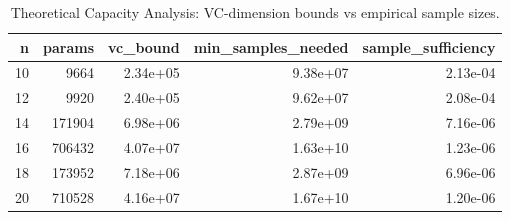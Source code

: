 \begin{table}
\caption{Theoretical Capacity Analysis: VC-dimension bounds vs empirical sample sizes.}
\label{tab:theory_capacity}
\begin{tabular}{rrrrr}
\toprule
n & params & vc_bound & min_samples_needed & sample_sufficiency \\
\midrule
10 & 9664 & 2.34e+05 & 9.38e+07 & 2.13e-04 \\
12 & 9920 & 2.40e+05 & 9.62e+07 & 2.08e-04 \\
14 & 171904 & 6.98e+06 & 2.79e+09 & 7.16e-06 \\
16 & 706432 & 4.07e+07 & 1.63e+10 & 1.23e-06 \\
18 & 173952 & 7.18e+06 & 2.87e+09 & 6.96e-06 \\
20 & 710528 & 4.16e+07 & 1.67e+10 & 1.20e-06 \\
\bottomrule
\end{tabular}
\end{table}
